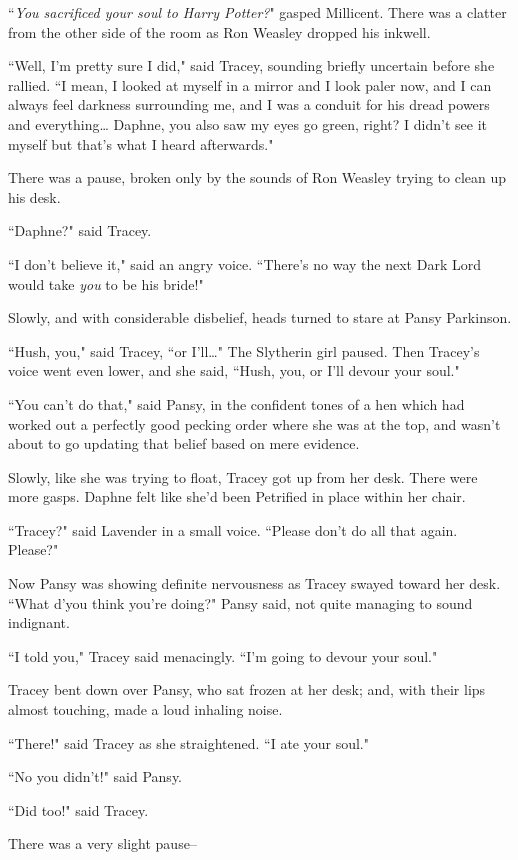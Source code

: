 ``\emph{You sacrificed your soul to Harry Potter?}" gasped Millicent. There was a clatter from the other side of the room as Ron Weasley dropped his inkwell.

``Well, I'm pretty sure I did," said Tracey, sounding briefly uncertain before she rallied. ``I mean, I looked at myself in a mirror and I look paler now, and I can always feel darkness surrounding me, and I was a conduit for his dread powers and everything{\ldots} Daphne, you also saw my eyes go green, right? I didn't see it myself but that's what I heard afterwards."

There was a pause, broken only by the sounds of Ron Weasley trying to clean up his desk.

``Daphne?" said Tracey.

``I don't believe it," said an angry voice. ``There's no way the next Dark Lord would take \emph{you} to be his bride!"

Slowly, and with considerable disbelief, heads turned to stare at Pansy Parkinson.

``Hush, you," said Tracey, ``or I'll{\ldots}" The Slytherin girl paused. Then Tracey's voice went even lower, and she said, ``Hush, you, or I'll devour your soul."

``You can't do that," said Pansy, in the confident tones of a hen which had worked out a perfectly good pecking order where she was at the top, and wasn't about to go updating that belief based on mere evidence.

Slowly, like she was trying to float, Tracey got up from her desk. There were more gasps. Daphne felt like she'd been Petrified in place within her chair.

``Tracey?" said Lavender in a small voice. ``Please don't do all that again. Please?"

Now Pansy was showing definite nervousness as Tracey swayed toward her desk. ``What d'you think you're doing?" Pansy said, not quite managing to sound indignant.

``I told you," Tracey said menacingly. ``I'm going to devour your soul."

Tracey bent down over Pansy, who sat frozen at her desk; and, with their lips almost touching, made a loud inhaling noise.

``There!" said Tracey as she straightened. ``I ate your soul."

``No you didn't!" said Pansy.

``Did too!" said Tracey.

There was a very slight pause\---

